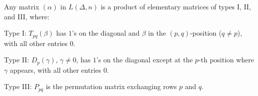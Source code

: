 Any matrix $(\alpha)$ in $L(\Delta, n)$ is a product of elementary matrices of types I, II, and III, where:

Type I: $T_{pq}(\beta)$ has $1$'s on the diagonal and $\beta$ in the $(p,q)$-position ($q \neq p$), with all other entries $0$.

Type II: $D_p(\gamma)$, $\gamma \neq 0$, has $1$'s on the diagonal except at the $p$-th position where $\gamma$ appears, with all other entries $0$.

Type III: $P_{pq}$ is the permutation matrix exchanging rows $p$ and $q$.
